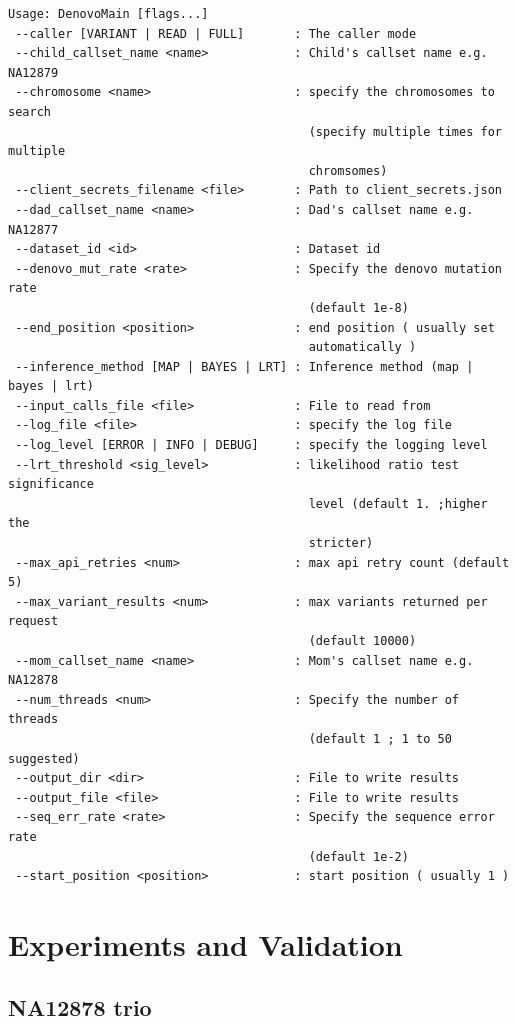 \documentclass{article}
\begin{document}
\begin{verbatim}
Usage: DenovoMain [flags...]
 --caller [VARIANT | READ | FULL]       : The caller mode
 --child_callset_name <name>            : Child's callset name e.g. NA12879
 --chromosome <name>                    : specify the chromosomes to search
                                          (specify multiple times for multiple
                                          chromsomes)
 --client_secrets_filename <file>       : Path to client_secrets.json
 --dad_callset_name <name>              : Dad's callset name e.g. NA12877
 --dataset_id <id>                      : Dataset id
 --denovo_mut_rate <rate>               : Specify the denovo mutation rate
                                          (default 1e-8)
 --end_position <position>              : end position ( usually set
                                          automatically )
 --inference_method [MAP | BAYES | LRT] : Inference method (map | bayes | lrt)
 --input_calls_file <file>              : File to read from
 --log_file <file>                      : specify the log file
 --log_level [ERROR | INFO | DEBUG]     : specify the logging level
 --lrt_threshold <sig_level>            : likelihood ratio test significance
                                          level (default 1. ;higher the
                                          stricter)
 --max_api_retries <num>                : max api retry count (default 5)
 --max_variant_results <num>            : max variants returned per request
                                          (default 10000)
 --mom_callset_name <name>              : Mom's callset name e.g. NA12878
 --num_threads <num>                    : Specify the number of threads
                                          (default 1 ; 1 to 50 suggested)
 --output_dir <dir>                     : File to write results
 --output_file <file>                   : File to write results
 --seq_err_rate <rate>                  : Specify the sequence error rate
                                          (default 1e-2)
 --start_position <position>            : start position ( usually 1 )
\end{verbatim}


\section{Experiments and Validation}
\label{experiments}

\subsection{NA12878 trio}
\end{document}
